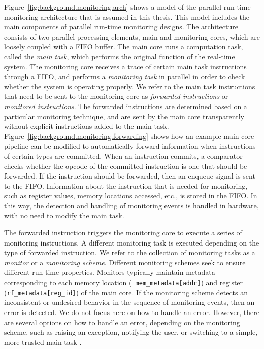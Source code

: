 Figure~\ref{fig:background.monitoring.arch} shows a model of the parallel
run-time monitoring architecture that is assumed in this thesis. This model
includes the main components of parallel run-time monitoring designs. The
architecture consists of two parallel processing elements, main and monitoring
cores, which are loosely coupled with a FIFO buffer.  The main core runs a
computation task, called the {\em main task}, which performs the original
function of the real-time system.  The monitoring core receives a trace of
certain main task instructions through a FIFO, and performs a {\em monitoring
task} in parallel in order to check whether the system is operating properly.
We refer to the main task instructions that need to be sent to the monitoring
core as {\em forwarded instructions} or {\em monitored instructions}. The
forwarded instructions are determined based on a particular monitoring
technique, and are sent by the main core transparently without explicit
instructions added to the main task.
Figure~\ref{fig:background.monitoring.forwarding} shows how an example
main core pipeline can be modified to automatically forward information when
instructions of certain types are committed. When an instruction commits, a
comparator checks whether the opcode of the committed instruction is one that
should be forwarded. If the instruction should be forwarded, then an enqueue
signal is sent to the FIFO.  Information about the instruction that is needed
for monitoring, such as register values, memory locations accessed, etc., is
stored in the FIFO. In this way, the detection and handling of monitoring
events is handled in hardware, with no need to modify the main task.

The forwarded instruction triggers the monitoring core to execute a series of
monitoring instructions.  A different monitoring task is executed depending on
the type of forwarded instruction. We refer to the collection of monitoring
tasks as a \emph{monitor} or a \emph{monitoring scheme}. Different monitoring
schemes seek to ensure different run-time properties.  Monitors typically
maintain metadata corresponding to each memory location ({\tt
mem\_metadata[addr]}) and register ({\tt rf\_metadata[reg\_id]}) of the main
core.  If the monitoring scheme detects an inconsistent or undesired behavior
in the sequence of monitoring events, then an error is detected. We do not
focus here on how to handle an error. However, there are several options
on how to handle an error, depending on the monitoring scheme, such as raising
an exception, notifying the user, or switching to a simple, more trusted main
task \cite{sha-simplex-sw01}.

